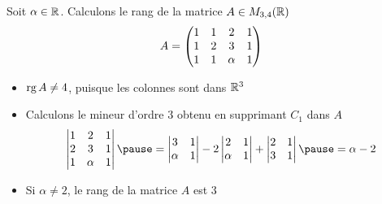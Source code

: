 \begin{frame}

\begin{exemple}  	
Soit $\alpha\in\mathbb{R}$. Calculons le rang de la matrice $A \in M_{3,4}(\mathbb{R})$
$$A= \begin{pmatrix}
1 & 1& 2&1\cr
1&2&3&1\cr
1&1&\alpha & 1 \cr
\end{pmatrix}$$\vspace*{-3ex}
\begin{itemize}
  \item\pause $\mathop{\text{rg}}\nolimits A \neq4$, puisque les colonnes sont dans $\mathbb{R}^3$
  
  \item\pause Calculons le mineur d'ordre $3$ obtenu en supprimant $C_1$ dans $A$
\pause
$$
\left | \begin{matrix}
1 & 2 & 1 \cr
2 & 3& 1 \cr
1& \alpha & 1 \cr
\end{matrix} \right |
\pause=
\left |\begin{matrix}3&1 \cr
\alpha & 1 \cr
\end{matrix}\right |
-2 \left | \begin{matrix}
2&1 \cr
\alpha & 1 \cr
\end{matrix}\right |
+\left | \begin{matrix}
2&1 \cr
3 & 1 \cr
\end{matrix}\right | \pause = \alpha -2 $$\vspace*{-2ex}
\item\pause Si $\alpha \neq 2$, le rang de la matrice $A$ est $3$
\end{itemize}
\end{exemple}
\end{frame}


